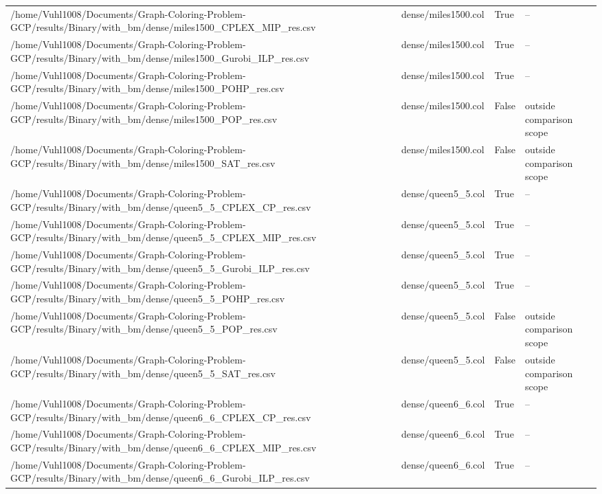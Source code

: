 \begin{table}[htbp]
\begin{tabular}{llll}
/home/Vuhl1008/Documents/Graph-Coloring-Problem-GCP/results/Binary/with\_bm/dense/miles1500\_CPLEX\_MIP\_res.csv & dense/miles1500.col & True & -- \\
/home/Vuhl1008/Documents/Graph-Coloring-Problem-GCP/results/Binary/with\_bm/dense/miles1500\_Gurobi\_ILP\_res.csv & dense/miles1500.col & True & -- \\
/home/Vuhl1008/Documents/Graph-Coloring-Problem-GCP/results/Binary/with\_bm/dense/miles1500\_POHP\_res.csv & dense/miles1500.col & True & -- \\
/home/Vuhl1008/Documents/Graph-Coloring-Problem-GCP/results/Binary/with\_bm/dense/miles1500\_POP\_res.csv & dense/miles1500.col & False & outside comparison scope \\
/home/Vuhl1008/Documents/Graph-Coloring-Problem-GCP/results/Binary/with\_bm/dense/miles1500\_SAT\_res.csv & dense/miles1500.col & False & outside comparison scope \\
/home/Vuhl1008/Documents/Graph-Coloring-Problem-GCP/results/Binary/with\_bm/dense/queen5\_5\_CPLEX\_CP\_res.csv & dense/queen5\_5.col & True & -- \\
/home/Vuhl1008/Documents/Graph-Coloring-Problem-GCP/results/Binary/with\_bm/dense/queen5\_5\_CPLEX\_MIP\_res.csv & dense/queen5\_5.col & True & -- \\
/home/Vuhl1008/Documents/Graph-Coloring-Problem-GCP/results/Binary/with\_bm/dense/queen5\_5\_Gurobi\_ILP\_res.csv & dense/queen5\_5.col & True & -- \\
/home/Vuhl1008/Documents/Graph-Coloring-Problem-GCP/results/Binary/with\_bm/dense/queen5\_5\_POHP\_res.csv & dense/queen5\_5.col & True & -- \\
/home/Vuhl1008/Documents/Graph-Coloring-Problem-GCP/results/Binary/with\_bm/dense/queen5\_5\_POP\_res.csv & dense/queen5\_5.col & False & outside comparison scope \\
/home/Vuhl1008/Documents/Graph-Coloring-Problem-GCP/results/Binary/with\_bm/dense/queen5\_5\_SAT\_res.csv & dense/queen5\_5.col & False & outside comparison scope \\
/home/Vuhl1008/Documents/Graph-Coloring-Problem-GCP/results/Binary/with\_bm/dense/queen6\_6\_CPLEX\_CP\_res.csv & dense/queen6\_6.col & True & -- \\
/home/Vuhl1008/Documents/Graph-Coloring-Problem-GCP/results/Binary/with\_bm/dense/queen6\_6\_CPLEX\_MIP\_res.csv & dense/queen6\_6.col & True & -- \\
/home/Vuhl1008/Documents/Graph-Coloring-Problem-GCP/results/Binary/with\_bm/dense/queen6\_6\_Gurobi\_ILP\_res.csv & dense/queen6\_6.col & True & -- \\

\end{tabular}
\end{table}
